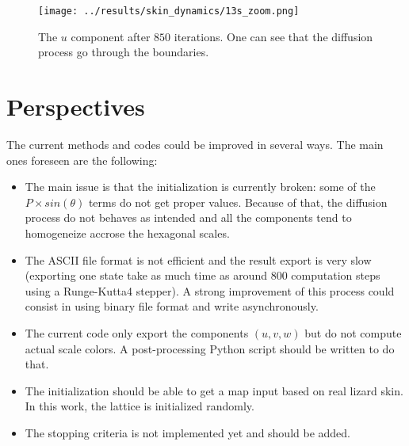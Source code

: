 \documentclass[a4paper]{article}
\begin{document}
\begin{figure}
\label{fig:init_state_u_13s}
	\texttt{[image: ../results/skin\_dynamics/13s\_zoom.png]}
	\caption{The $u$ component after $850$ iterations. One can see that the diffusion process go through the boundaries.}
\end{figure}

\section{Perspectives}
\label{sec:perspectives}

The current methods and codes could be improved in several ways. The main ones foreseen are the following:
\begin{itemize}
	\item The main issue is that the initialization is currently broken: some of the $P \times sin(\theta)$ terms do not get proper values. Because of that, the diffusion process do not behaves as intended and all the components tend to homogeneize accrose the hexagonal scales.
	\item The ASCII file format is not efficient and the result export is very slow (exporting one state take as much time as around 800 computation steps using a Runge-Kutta4 stepper). A strong improvement of this process could consist in using binary file format and write asynchronously.
	\item The current code only export the components $(u, v, w)$ but do not compute actual scale colors. A post-processing Python script should be written to do that.
	\item The initialization should be able to get a map input based on real lizard skin. In this work, the lattice is initialized randomly.
	\item The stopping criteria is not implemented yet and should be added.
\end{itemize}



\listoffigures
\end{document}
